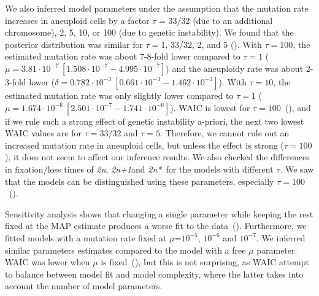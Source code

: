 \documentclass[12pt]{extarticle}
\newcommand{\euwt}{\emph{2n}}
\newcommand{\anwt}{\emph{2n+1}}
\newcommand{\eumt}{\emph{2n*}}
\begin{document}

We also inferred model parameters under the assumption that the mutation rate increases in aneuploid cells by a factor $\tau$ = 33/32 (due to an additional chromosome), 2, 5, 10, or 100 (due to genetic instability).
We found that the posterior distribution was similar for $\tau=$1, 33/32, 2, and 5 ().
With $\tau=100$, the estimated mutation rate was about 7-8-fold lower compared to $\tau=1$ ($\mu=3.81\cdot10^{-7}\ [1.508\cdot10^{-7}-4.995\cdot10^{-7}]$) and the aneuploidy rate was about 2-3-fold lower ($\delta=0.782\cdot10^{-3}\ [0.661\cdot10^{-3}-1.462\cdot10^{-3}]$). 
With $\tau=10$, the estimated mutation rate was only slightly lower compared to $\tau=1$ ($\mu=1.674\cdot10^{-6}\ [2.501\cdot10^{-7}-1.741\cdot10^{-6}]$). 
WAIC is lowest for $\tau=100$~(), and if we rule such a strong effect of genetic instability a-priori, the next two lowest WAIC values are for $\tau=33/32$ and $\tau=5$.  
Therefore, we cannot rule out an increased mutation rate in aneuploid cells, but unless the effect is strong ($\tau=100$), it does not seem to affect our inference results.
We also checked the differences in fixation/loss times of  \euwt, \anwt and \eumt\  for the models with different $\tau$. We saw that the models can be distinguished using these parameters, especially $\tau=100$~().

Sensitivity analysis shows that changing a single parameter while keeping the rest fixed at the MAP estimate produces a worse fit to the data~().
Furthermore, we fitted models with a mutation rate fixed at $\mu$=$10^{-5}$, $10^{-6}$ and $10^{-7}$. We inferred similar parameters estimates compared to the model with a free $\mu$ parameter. %
WAIC was lower when $\mu$ is fixed~(), but this is not surprising, as WAIC attempt to balance between model fit and model complexity, where the latter takes into account the number of model parameters. 
\end{document}
